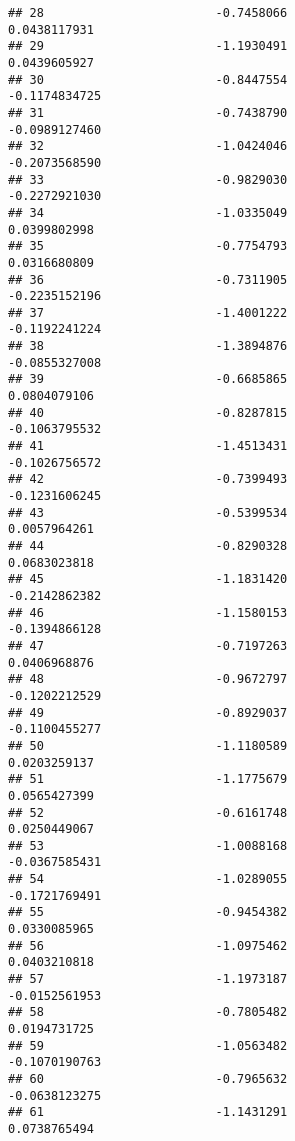 \documentclass[
]{article}
\begin{document}
\begin{verbatim}
## 28                        -0.7458066                          0.0438117931
## 29                        -1.1930491                          0.0439605927
## 30                        -0.8447554                         -0.1174834725
## 31                        -0.7438790                         -0.0989127460
## 32                        -1.0424046                         -0.2073568590
## 33                        -0.9829030                         -0.2272921030
## 34                        -1.0335049                          0.0399802998
## 35                        -0.7754793                          0.0316680809
## 36                        -0.7311905                         -0.2235152196
## 37                        -1.4001222                         -0.1192241224
## 38                        -1.3894876                         -0.0855327008
## 39                        -0.6685865                          0.0804079106
## 40                        -0.8287815                         -0.1063795532
## 41                        -1.4513431                         -0.1026756572
## 42                        -0.7399493                         -0.1231606245
## 43                        -0.5399534                          0.0057964261
## 44                        -0.8290328                          0.0683023818
## 45                        -1.1831420                         -0.2142862382
## 46                        -1.1580153                         -0.1394866128
## 47                        -0.7197263                          0.0406968876
## 48                        -0.9672797                         -0.1202212529
## 49                        -0.8929037                         -0.1100455277
## 50                        -1.1180589                          0.0203259137
## 51                        -1.1775679                          0.0565427399
## 52                        -0.6161748                          0.0250449067
## 53                        -1.0088168                         -0.0367585431
## 54                        -1.0289055                         -0.1721769491
## 55                        -0.9454382                          0.0330085965
## 56                        -1.0975462                          0.0403210818
## 57                        -1.1973187                         -0.0152561953
## 58                        -0.7805482                          0.0194731725
## 59                        -1.0563482                         -0.1070190763
## 60                        -0.7965632                         -0.0638123275
## 61                        -1.1431291                          0.0738765494

\end{verbatim}
\end{document}
